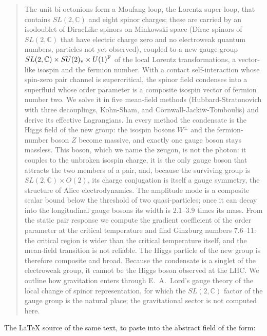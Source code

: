 \documentclass[11pt]{article}
\begin{document}
\begin{quote}
The unit bi-octonions form a Moufang loop, the Lorentz super-loop, that contains $SL(2,\mathbb C)$ and eight spinor charges; these are carried by an isodoublet of DiracLike spinors on Minkowski space (Dirac spinors of $SL(2,\mathbb C)$ that have electric charge zero and no electroweak quantum numbers, particles not yet observed), coupled to a new gauge group $SL(2,\mathbb C)\times SU(2)_{\rm v}\times U(1)^{\rm F}$ of the local Lorentz transformations, a vector-like isospin and the fermion number. With a contact self-interaction whose spin-zero pair channel is supercritical, the spinor field condenses into a superfluid whose order parameter is a composite isospin vector of fermion number two. We solve it in five mean-field methods (Hubbard-Stratonovich with three decouplings, Kohn-Sham, and Cornwall-Jackiw-Tomboulis) and derive its effective Lagrangians. In every method the condensate is the Higgs field of the new group: the isospin bosons $W^\pm$ and the fermion-number boson $Z$ become massive, and exactly one gauge boson stays massless. This boson, which we name the zeugon, is not the photon: it couples to the unbroken isospin charge, it is the only gauge boson that attracts the two members of a pair, and, because the surviving group is $SL(2,\mathbb C)\times O(2)$, its charge conjugation is itself a gauge symmetry, the structure of Alice electrodynamics. The amplitude mode is a composite scalar bound below the threshold of two quasi-particles; once it can decay into the longitudinal gauge bosons its width is $2.1\mbox{--}3.9$ times its mass. From the static pair response we compute the gradient coefficient of the order parameter at the critical temperature and find Ginzburg numbers 7.6\mbox{--}11: the critical region is wider than the critical temperature itself, and the mean-field transition is not reliable. The Higgs particle of the new group is therefore composite and broad. Because the condensate is a singlet of the electroweak group, it cannot be the Higgs boson observed at the LHC. We outline how gravitation enters through E.~A.~Lord's gauge theory of the local change of spinor representation, for which the $SL(2,\mathbb C)$ factor of the gauge group is the natural place; the gravitational sector is not computed here.
\end{quote}

The LaTeX source of the same text, to paste into the abstract field of the form:
\end{document}
